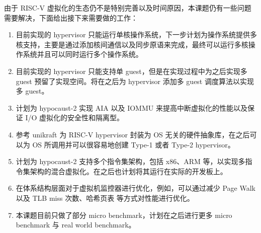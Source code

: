 由于 RISC-V 虚拟化的生态仍不是特别完善以及时间原因，本课题仍有一些问题需要解决，下面给出接下来需要做的工作：
\begin{enumerate}
    \item 目前实现的 hypervisor 只能运行单核操作系统，下一步计划为操作系统提供多核支持，主要是通过添加核间通信以及同步原语来完成，最终可以运行多核操作系统并且可以同时运行多个操作系统。
    \item 目前实现的 hypervisor 只能支持单 guest，但是在实现过程中为之后实现多 guest 预留了实现空间。将在之后为 hypervisor 添加多 guest 调度算法以实现多 guest。
    \item 计划为 hypocaust-2 实现 AIA 以及 IOMMU 来提高中断虚拟化的性能以及保证 I/O 虚拟化的安全性和隔离型。
    \item 参考 unikraft\cite{kuenzer2021unikraft} 为 RISC-V hypervisor 封装为 OS 无关的硬件抽象库，在之后可以为 OS 所调用并可以很容易地创建 Type-1 或者 Type-2 hypervisor。
    \item 计划为 hypocaust-2 支持多个指令集架构，包括 x86、ARM 等，以实现多指令集架构的混合虚拟化。在之后也计划将其运行在实际的开发板上。
    \item 在体系结构层面对于虚拟机监控器进行优化，例如，可以通过减少 Page Walk 以及 TLB miss 次数\cite{park2022every, barr2010translation}、哈希页表\cite{yaniv2016hash} 等方式对性能进行优化。
    \item 本课题目前只做了部分 micro benchmark，计划在之后进行更多 micro benchmark 与 real world benchmark。
\end{enumerate}



